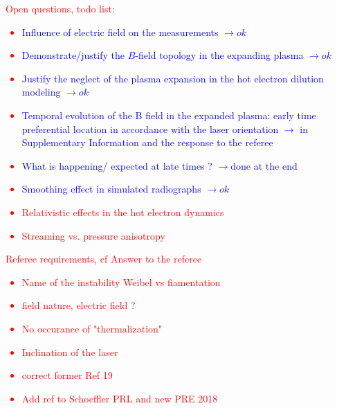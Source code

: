 \documentclass[aps,twocolumn,showpacs,superscriptaddress]{revtex4}
\begin{document}
\textcolor{red}{
Open questions, todo list:
\begin{itemize}
\item \textcolor{blue}{ Influence of electric field on the measurements $\rightarrow ok $ }
\item \textcolor{blue}{ Demonstrate/justify the $B$-field topology in the expanding plasma $\rightarrow ok $ }
\item \textcolor{blue}{Justify the neglect of the plasma expansion in the hot electron dilution modeling $\rightarrow ok $ }
\item  \textcolor{blue}{ Temporal evolution of the B field in the expanded plasma: early time preferential location in accordance with the laser orientation $\rightarrow$ in Supplementary Information and the response to the referee}
\item  \textcolor{blue}{ What is happening/ expected at late times ? $\rightarrow $done at the end }
\item  \textcolor{blue}{ Smoothing effect in simulated radiographs $\rightarrow ok $}
\item Relativistic effects in the hot electron dynamics
\item Streaming vs. pressure anisotropy
\end{itemize}
}

\textcolor{red}{
Referee requirements, cf Answer to the referee
\begin{itemize}
\item Name of the instability Weibel vs fiamentation
\item field nature, electric field ?
\item No occurance of "thermalization"
\item Inclination of the laser
\item correct former Ref 19
\item Add ref to Schoeffler PRL and new PRE 2018
\end{itemize}
}



\end{document}
